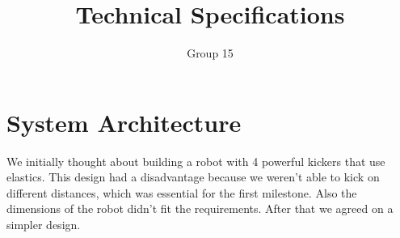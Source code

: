 \documentclass[12pt]{article}
\title{Technical Specifications}
\author{Group 15}
\begin{document}
\graphicspath{ {images/} }
	\maketitle
	\setlength{\parindent}{0pt}
\bigskip

 \section{System Architecture} 
  \bigskip
  
  We initially thought about building a robot with 4 powerful kickers that use elastics. This design had a disadvantage because we weren't able to kick on different distances, which was essential for the first milestone. Also the dimensions of the robot didn't fit the requirements. 
	After that we agreed on a simpler design.
\end{document}
